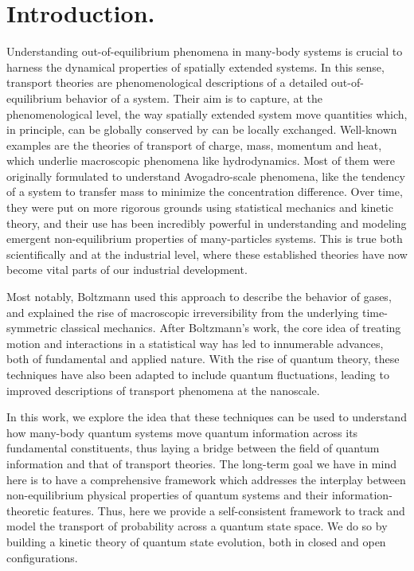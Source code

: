 \documentclass[draft,nofootinbib,pre,twocolumn,showpacs,showkeys,preprintnumbers,floatfix]{revtex4-1}
\newcommand{\1}{\mathbbm{1}}
\begin{document}

\date{\today}
\maketitle





\section*{Introduction.} Understanding out-of-equilibrium phenomena in many-body systems 
is crucial to harness the dynamical properties of spatially extended systems. In this sense, transport 
theories are phenomenological descriptions of a detailed out-of-equilibrium behavior of a system. Their 
aim is to capture, at the phenomenological level, the way spatially extended system move quantities
which, in principle, can be globally conserved by can be locally exchanged. Well-known examples are the 
theories of transport of charge, mass, momentum and heat, which underlie macroscopic phenomena like hydrodynamics. 
Most of them were originally formulated to understand Avogadro-scale phenomena, like the tendency of a 
system to transfer mass to minimize the concentration difference. Over time, they were put on more rigorous 
grounds using statistical mechanics and kinetic theory, and their use has been incredibly powerful in understanding 
and modeling emergent non-equilibrium properties of many-particles systems. This is true both scientifically and 
at the industrial level, where these established theories have now become vital parts of our industrial 
development.
 
Most notably, Boltzmann used this approach to describe the behavior of gases, and explained the rise of 
macroscopic irreversibility from the underlying time-symmetric classical mechanics. After 
Boltzmann's work, the core idea of treating motion and interactions in a statistical way has 
led to innumerable advances, both of fundamental and applied nature. With the rise of 
quantum theory, these techniques have also been adapted to include quantum fluctuations, 
leading to improved descriptions of transport phenomena at the nanoscale.
 
In this work, we explore the idea that these techniques can be used to understand how many-body 
quantum systems move quantum information across its fundamental constituents, thus laying a bridge 
between the field of quantum information and that of transport theories. The long-term goal we have in mind
here is to have a comprehensive framework which addresses the interplay between non-equilibrium physical 
properties of quantum systems and their information-theoretic features. Thus, here we provide a self-consistent 
framework to track and model the transport of probability across a quantum state space. We do so by building 
a kinetic theory of quantum state evolution, both in closed and open configurations.
\end{document}
